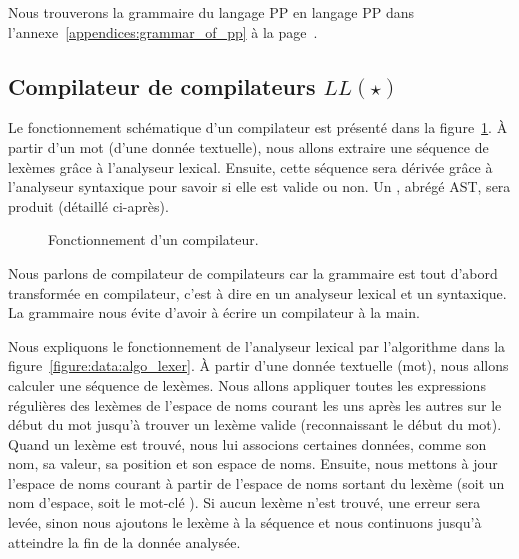 Nous trouverons la grammaire du langage PP en langage PP dans
l'annexe~\ref{appendices:grammar_of_pp} à la
page~\pageref{appendices:grammar_of_pp}.

\subsection{Compilateur de compilateurs $LL(\star)$}
\label{subsection:data:compiler-compiler}

Le fonctionnement schématique d'un compilateur est présenté dans la
figure~\ref{figure:data:compiler}. À partir d'un {\strong mot} (d'une donnée
textuelle), nous allons extraire une {\strong séquence} de lexèmes grâce à
l'analyseur {\strong lexical}. Ensuite, cette séquence sera {\strong dérivée}
grâce à l'analyseur {\strong syntaxique} pour savoir si elle est valide ou non.
Un , abrégé AST, sera produit (détaillé
ci-après).
%
\begin{figure}


\caption{\label{figure:data:compiler} Fonctionnement d'un compilateur.}

\end{figure}
%
Nous parlons de {\strong compilateur de compilateurs} car la grammaire est tout
d'abord transformée en compilateur, c'est à dire en un analyseur lexical et un
syntaxique. La grammaire nous évite d'avoir à écrire un compilateur à la main.

Nous expliquons le fonctionnement de l'analyseur lexical par l'algorithme dans
la figure~\ref{figure:data:algo_lexer}. À partir d'une donnée textuelle (mot),
nous allons calculer une séquence de lexèmes. Nous allons appliquer toutes les
expressions régulières des lexèmes de l'espace de noms courant les uns après les
autres sur le début du mot jusqu'à trouver un lexème valide (reconnaissant le
début du mot). Quand un lexème est trouvé, nous lui associons certaines données,
comme son nom, sa valeur, sa position et son espace de noms. Ensuite, nous
mettons à jour l'espace de noms courant à partir de l'espace de noms sortant du
lexème (soit un nom d'espace, soit le mot-clé ). Si
aucun lexème n'est trouvé, une erreur sera levée, sinon nous ajoutons le lexème
à la séquence et nous continuons jusqu'à atteindre la fin de la donnée analysée.

